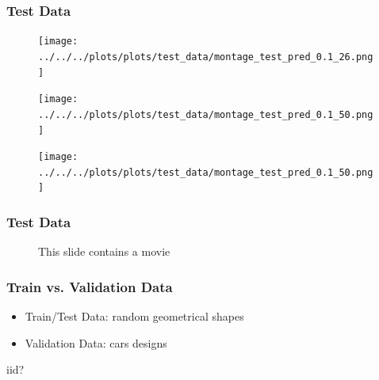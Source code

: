 \documentclass{beamer}
\begin{document}
\begin{frame}
\frametitle{Test Data \Sadey[1.5]}
\vspace{-0.40cm}
\begin{figure}[!htb]%
    \hspace{-0.55cm}
    \begin{minipage}{0.41\textwidth}%
       \texttt{[image: ../../../plots/plots/test\_data/montage\_test\_pred\_0.1\_26.png]}%
    \end{minipage}%
    \hspace{0.25cm}
    \begin{minipage}{0.41\textwidth}%
        \texttt{[image: ../../../plots/plots/test\_data/montage\_test\_pred\_0.1\_50.png]}%
    \end{minipage}%
    \hspace{0.1cm}
    \begin{minipage}{0.1\textwidth}%
        \vspace{1.75cm}
        \texttt{[image: ../../../plots/plots/test\_data/montage\_test\_pred\_0.1\_50.png]}%
    \end{minipage}%
\end{figure}
\end{frame}


\begin{frame}
\frametitle{Test Data}
\begin{figure}[!htb]%
\caption{This slide contains a movie}
\end{figure}
\end{frame}


\begin{frame}
\frametitle{Train vs. Validation Data}
\begin{itemize}
\item Train/Test Data: random geometrical shapes
\item Validation Data: cars designs
\end{itemize}
\vspace{1cm}
\centering
\Huge{iid?}
\end{frame}
\end{document}
